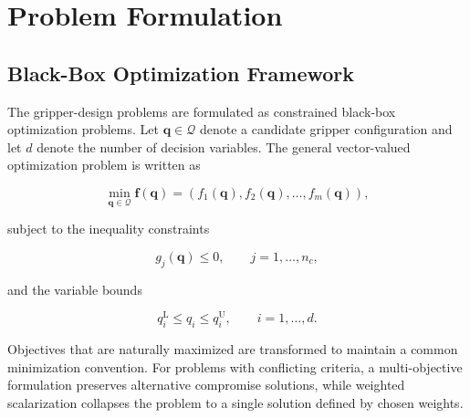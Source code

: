 \section{Problem Formulation}
\label{sec:methodology_problem_formulation}

\subsection{Black-Box Optimization Framework}
\label{subsec:methodology_moo}

The gripper-design problems are formulated as constrained black-box optimization problems. Let \(\mathbf{q} \in \mathcal{Q}\) denote a candidate
gripper configuration and let \(d\) denote the number of decision variables. The general vector-valued optimization problem is written as

\begin{equation}
    \min_{\mathbf{q} \in \mathcal{Q}}
    \mathbf{f}(\mathbf{q})
    =
    \left(
        f_1(\mathbf{q}),
        f_2(\mathbf{q}),
        \dots,
        f_m(\mathbf{q})
    \right),
\end{equation}

subject to the inequality constraints

\begin{equation}
    g_j(\mathbf{q}) \leq 0,
    \qquad j = 1,\dots,n_c,
\end{equation}

and the variable bounds

\begin{equation}
    q_i^{\mathrm{L}}
    \leq q_i
    \leq q_i^{\mathrm{U}},
    \qquad i = 1,\dots,d.
\end{equation}

 
 

Objectives that are naturally maximized are transformed to maintain a common minimization convention. For problems with conflicting criteria, a
multi-objective formulation preserves alternative compromise solutions, while weighted scalarization collapses the problem to a single solution
defined by chosen weights\cite{Zheng2024Proven}.

